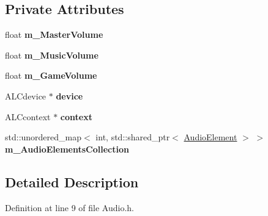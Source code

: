\subsection*{Private Attributes}
\begin{DoxyCompactItemize}
\item 
float {\bfseries m\+\_\+\+Master\+Volume}\hypertarget{class_i_o_1_1_audio_1_1_audio_a9559f0dca415c5764d686062884ac1cf}{}\label{class_i_o_1_1_audio_1_1_audio_a9559f0dca415c5764d686062884ac1cf}

\item 
float {\bfseries m\+\_\+\+Music\+Volume}\hypertarget{class_i_o_1_1_audio_1_1_audio_a1f3534128042225669467fa0d1f839c2}{}\label{class_i_o_1_1_audio_1_1_audio_a1f3534128042225669467fa0d1f839c2}

\item 
float {\bfseries m\+\_\+\+Game\+Volume}\hypertarget{class_i_o_1_1_audio_1_1_audio_a3b8a67062fe14330aa1da8bc1b1001f9}{}\label{class_i_o_1_1_audio_1_1_audio_a3b8a67062fe14330aa1da8bc1b1001f9}

\item 
A\+L\+Cdevice $\ast$ {\bfseries device}\hypertarget{class_i_o_1_1_audio_1_1_audio_ac3e39acf964905bc2d113d846b0c8bc2}{}\label{class_i_o_1_1_audio_1_1_audio_ac3e39acf964905bc2d113d846b0c8bc2}

\item 
A\+L\+Ccontext $\ast$ {\bfseries context}\hypertarget{class_i_o_1_1_audio_1_1_audio_a87634f06b7f51d2404e427cc6102046f}{}\label{class_i_o_1_1_audio_1_1_audio_a87634f06b7f51d2404e427cc6102046f}

\item 
std\+::unordered\+\_\+map$<$ int, std\+::shared\+\_\+ptr$<$ \hyperlink{class_i_o_1_1_audio_1_1_audio_element}{Audio\+Element} $>$ $>$ {\bfseries m\+\_\+\+Audio\+Elements\+Collection}\hypertarget{class_i_o_1_1_audio_1_1_audio_afa7fe54debf2c73565314da2ca96081f}{}\label{class_i_o_1_1_audio_1_1_audio_afa7fe54debf2c73565314da2ca96081f}

\end{DoxyCompactItemize}


\subsection{Detailed Description}


Definition at line 9 of file Audio.\+h.

